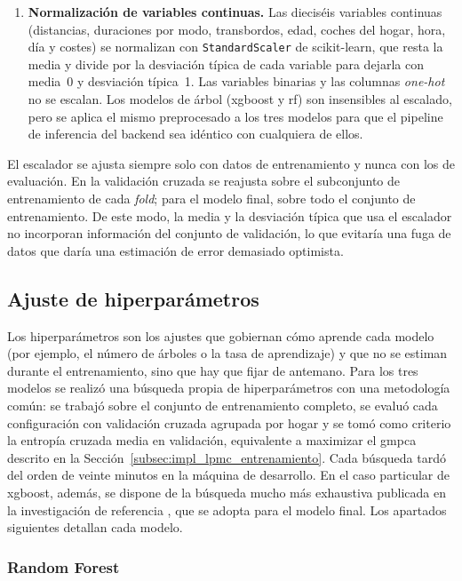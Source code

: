 \begin{enumerate}
  \item \textbf{Normalización de variables continuas.} Las dieciséis variables continuas (distancias, duraciones por modo, transbordos, edad, coches del hogar, hora, día y costes) se normalizan con \texttt{StandardScaler} de scikit-learn, que resta la media y divide por la desviación típica de cada variable para dejarla con media~0 y desviación típica~1. Las variables binarias y las columnas \textit{one-hot} no se escalan. Los modelos de árbol (\gls{xgboost} y \gls{rf}) son insensibles al escalado, pero se aplica el mismo preprocesado a los tres modelos para que el pipeline de inferencia del backend sea idéntico con cualquiera de ellos.
\end{enumerate}

El escalador se ajusta siempre solo con datos de entrenamiento y nunca con los de evaluación. En la validación cruzada se reajusta sobre el subconjunto de entrenamiento de cada \textit{fold}; para el modelo final, sobre todo el conjunto de entrenamiento. De este modo, la media y la desviación típica que usa el escalador no incorporan información del conjunto de validación, lo que evitaría una fuga de datos que daría una estimación de error demasiado optimista.

\subsection{Ajuste de hiperparámetros}
\label{subsec:impl_lpmc_hiperparametros}

Los hiperparámetros son los ajustes que gobiernan cómo aprende cada modelo (por ejemplo, el número de árboles o la tasa de aprendizaje) y que no se estiman durante el entrenamiento, sino que hay que fijar de antemano. Para los tres modelos se realizó una búsqueda propia de hiperparámetros con una metodología común: se trabajó sobre el conjunto de entrenamiento completo, se evaluó cada configuración con validación cruzada agrupada por hogar y se tomó como criterio la entropía cruzada media en validación, equivalente a maximizar el \gls{gmpca} descrito en la Sección~\ref{subsec:impl_lpmc_entrenamiento}. Cada búsqueda tardó del orden de veinte minutos en la máquina de desarrollo. En el caso particular de \gls{xgboost}, además, se dispone de la búsqueda mucho más exhaustiva publicada en la investigación de referencia \cite{MartinBaos2023Thesis}, que se adopta para el modelo final. Los apartados siguientes detallan cada modelo.

\subsubsection*{Random Forest}

